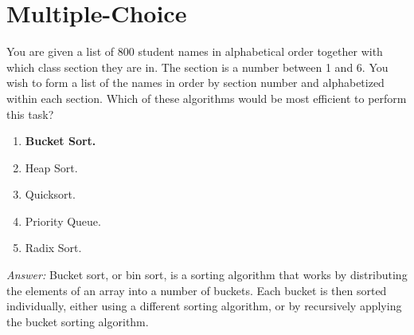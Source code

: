 \documentclass[a4paper]{article}
\newcommand{\ans}{\textit{Answer: }}
\newenvironment{question}[2][Question]{\begin{trivlist}
\item[\hskip \labelsep {\bfseries #1}\hskip \labelsep {\bfseries #2.}]}{\end{trivlist}}
\begin{document}
\section*{Multiple-Choice}
\begin{question}{8}
You are given a list of 800 student names in alphabetical order together with
which class section they are in. The section is a number between 1 and 6. You wish to form
a list of the names in order by section number and alphabetized within each section. Which
of these algorithms would be most efficient to perform this task? 

\begin{enumerate}[label=\alph*]
  \item \textbf{Bucket Sort.}
  \item Heap Sort.
  \item Quicksort.
  \item Priority Queue.
  \item Radix Sort.
\end{enumerate}
\ans Bucket sort, or bin sort, is a sorting algorithm that works by distributing the elements of an array into a number of buckets. Each bucket is then sorted individually, either using a different sorting algorithm, or by recursively applying the bucket sorting algorithm.
\end{question}
\end{document}

